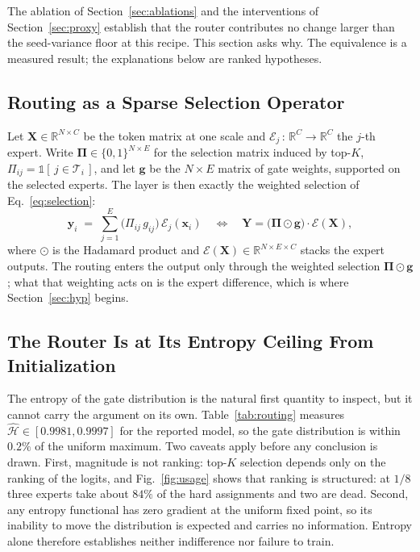 \documentclass[10pt,a4paper,twocolumn,twoside]{article}
\newcommand{\bx}{\mathbf{x}}
\newcommand{\bX}{\mathbf{X}}
\newcommand{\bY}{\mathbf{Y}}
\newcommand{\by}{\mathbf{y}}
\newcommand{\bg}{\mathbf{g}}
\newcommand{\bPi}{\boldsymbol{\Pi}}
\newcommand{\E}{\mathcal{E}}
\newcommand{\Hs}{\hat{\mathcal{H}}}
\newcommand{\reals}{\mathbb{R}}
\begin{document}
The ablation of Section~\ref{sec:ablations} and the interventions of Section~\ref{sec:proxy}
establish that the router contributes no change larger than the seed-variance floor at
this recipe. This section asks why. The equivalence is a measured result; the
explanations below are ranked hypotheses.

\subsection{Routing as a Sparse Selection Operator}
Let $\bX \in \reals^{N \times C}$ be the token matrix at one scale and
$\E_j \,:\, \reals^{C} \to \reals^{C}$ the $j$-th expert. Write
$\bPi \in \{0,1\}^{N \times E}$ for the selection matrix induced by top-$K$,
$\Pi_{ij} = \mathbb{1}[\,j \in \mathcal{T}_i\,]$,
and let $\bg$ be the $N \times E$ matrix of gate weights, supported on the selected experts.
The layer is then exactly the weighted selection of Eq.~\eqref{eq:selection}:
\begin{equation}
  \by_i \;=\; \sum_{j=1}^{E} \bigl(\Pi_{ij}\, g_{ij}\bigr)\, \E_j(\bx_i)
  \quad\Longleftrightarrow\quad
  \bY = \bigl(\bPi \odot \bg\bigr) \cdot \E(\bX),
  \label{eq:selection}
\end{equation}
where $\odot$ is the Hadamard product and $\E(\bX) \in \reals^{N \times E \times C}$ stacks
the expert outputs. The routing enters the output only through the weighted selection
$\bPi \odot \bg$; what that weighting acts on is the expert difference, which is where
Section~\ref{sec:hyp} begins.


\subsection{The Router Is at Its Entropy Ceiling From Initialization}
\label{sec:info}
The entropy of the gate distribution is the natural first quantity to inspect, but it cannot
carry the argument on its own. Table~\ref{tab:routing} measures $\Hs \in [0.9981, 0.9997]$ for
the reported model, so the gate distribution is within $0.2\%$ of the uniform maximum. Two caveats apply before any conclusion is drawn. First, magnitude is not ranking:
top-$K$ selection depends only on the ranking of the logits, and Fig.~\ref{fig:usage}
shows that ranking is structured: at $1/8$ three experts take about $84\%$ of the hard
assignments and two are dead. Second, any entropy functional has zero gradient at the
uniform fixed point, so its inability to move the distribution is expected and
carries no information. Entropy alone therefore establishes neither indifference nor failure to train.
\end{document}
